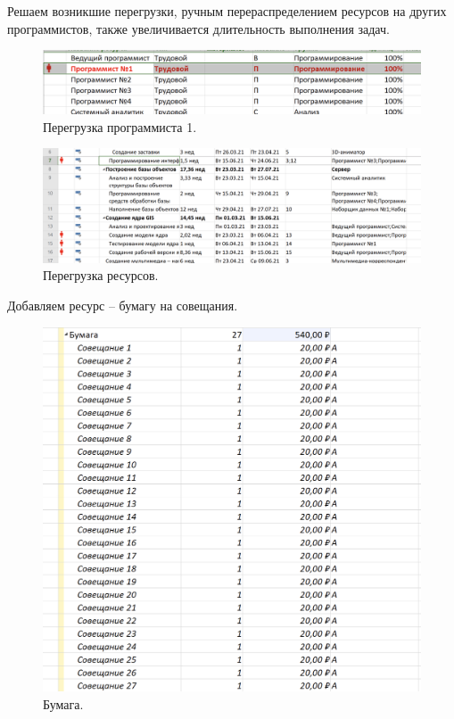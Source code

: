 \documentclass[a4paper,14pt]{extreport} %
\begin{document}
\begin{enumerate}
Решаем возникшие перегрузки, ручным перераспределением ресурсов на других программистов, также увеличивается длительность выполнения задач.

\begin{figure}[H]
  \centering
  \caption{Перегрузка программиста 1. }
  \includegraphics[scale=0.5]{10}
\end{figure}

\begin{figure}[H]
  \centering
  \caption{Перегрузка ресурсов. }
  \includegraphics[scale=0.5]{9}
\end{figure}

Добавляем ресурс -- бумагу на совещания.

\begin{figure}[H]
  \centering
  \caption{Бумага. }
  \includegraphics[scale=0.5]{11}
\end{figure}


\end{enumerate}
\end{document}
